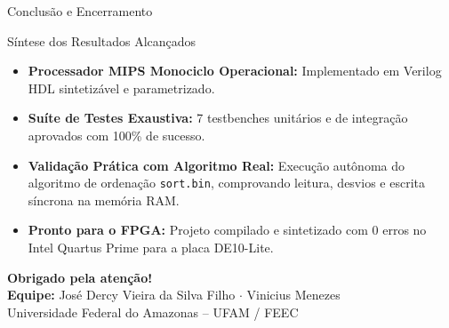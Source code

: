 \documentclass[aspectratio=169, 11pt]{beamer}
\begin{document}
\begin{frame}{Conclusão e Encerramento}
  \begin{block}{Síntese dos Resultados Alcançados}
    \begin{itemize}\setlength{\itemsep}{6pt}
      \item \textbf{Processador MIPS Monociclo Operacional:} Implementado em Verilog HDL sintetizável e parametrizado.
      \item \textbf{Suíte de Testes Exaustiva:} 7 testbenches unitários e de integração aprovados com 100\% de sucesso.
      \item \textbf{Validação Prática com Algoritmo Real:} Execução autônoma do algoritmo de ordenação \texttt{sort.bin}, comprovando leitura, desvios e escrita síncrona na memória RAM.
      \item \textbf{Pronto para o FPGA:} Projeto compilado e sintetizado com 0 erros no Intel Quartus Prime para a placa DE10-Lite.
    \end{itemize}
  \end{block}

  \vspace{0.4cm}
  \centering
  {\Large \textbf{Obrigado pela atenção!}} \\
  \vspace{0.2cm}
  \footnotesize
  \textbf{Equipe:} José Dercy Vieira da Silva Filho $\cdot$ Vinicius Menezes \\
  Universidade Federal do Amazonas -- UFAM / FEEC
\end{frame}
\end{document}
